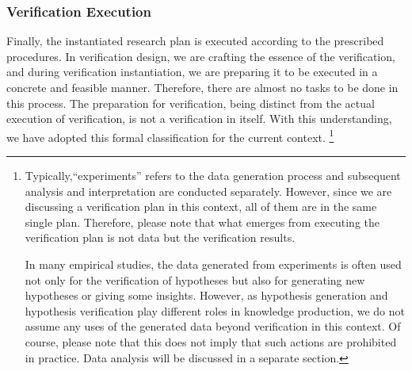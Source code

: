 \documentclass{book}
\begin{document}
\subsubsection{Verification Execution}
Finally, the instantiated research plan is executed according to the prescribed procedures. In verification design, we are crafting the essence of the verification, and during verification instantiation, we are preparing it to be executed in a concrete and feasible manner. Therefore, there are almost no tasks to be done in this process. The preparation for verification, being distinct from the actual execution of verification, is not a verification in itself. With this understanding, we have adopted this formal classification for the current context.
\footnote{
Typically,``experiments'' refers to the data generation process and subsequent analysis and interpretation are conducted separately. However, since we are discussing a verification plan in this context, all of them are in the same single plan. Therefore, please note that what emerges from executing the verification plan is not data but the verification results.

In many empirical studies, the data generated from experiments is often used not only for the verification of hypotheses but also for generating new hypotheses or giving some insights. However, as hypothesis generation and hypothesis verification play different roles in knowledge production, we do not assume any uses of the generated data beyond verification in this context. Of course, please note that this does not imply that such actions are prohibited in practice. Data analysis will be discussed in a separate section.
}



\end{document}

